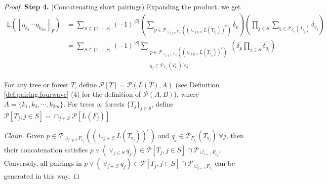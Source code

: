 \begin{proof}
 
 \textbf{Step 4.} (Concatenating short pairings) Expanding the product, we get
 \begin{equation}\label{eq.lemrenorm4.fourwave}
  \begin{split}
  \mathbb{E}([\eta_{k_1}\cdots \eta_{k_{2m}}]_F) &= \sum_{S\subseteq\{1,\cdots,r\}}(-1)^{|S|}
  \left(\sum_{p\in \mathcal{P}_{\cup_{j'\notin S} F_{\mathfrak{r}_{j'}}}((\cup_{j\in S}L(T_{\mathfrak{r}_j}))^c)}\delta_p\right)
  \left(\prod_{j\in S}\sum_{q\in \mathcal{P}_{F_{\mathfrak{r}_j}}(T_{\mathfrak{r}_j})} \delta_{q_j}\right)
  \\
  & =\sum_{S\subseteq\{1,\cdots,r\}}(-1)^{|S|}\sum_{\substack{p\in \mathcal{P}_{\cup_{j'\notin S} F_{\mathfrak{r}_{j'}}}((\cup_{j\in S}L(T_{\mathfrak{r}_j}))^c)
  \\q_j\in 
  \mathcal{P}_{F_{\mathfrak{r}_j}}(T_{\mathfrak{r}_j})\ \forall j}} \left(\delta_p
  \prod_{j\in S} \delta_{q_j}\right)
  \end{split}
 \end{equation}
 
  
  
 For any tree or forest $T$, define $\mathcal{P}[T]=\mathcal{P}(L(T),A)$ (see Definition \ref{def.pairing.fourwave} (4) for the definition of $\mathcal{P}(A,B)$), where $A=\{k_1,k_2,\cdots,k_{2m}\}$. For trees or forests $\{T_j\}_{j\in S}$, define $\mathcal{P}[T_j,j\in S]=\cap_{j\in S}\mathcal{P}[L(F_j)]$. 
 
 \textit{Claim.} Given $p\in \mathcal{P}_{\cup_{j'\notin S} F_{\mathfrak{r}_{j'}}}((\cup_{j\in S}L(T_{\mathfrak{r}_j}))^c)$ and $q_j\in 
 \mathcal{P}_{F_{\mathfrak{r}_j}}(T_{\mathfrak{r}_j})\ \forall j$, then their concatenation satisfies $p\vee (\vee_{j\in S} q_j)\in \mathcal{P}[T_j,j\in S]\cap \mathcal{P}_{\cup_{j=1}^r F_{\mathfrak{r}_{j}}}$. Conversely, all pairings in $p\vee (\vee_{j\in S} q_j)\in \mathcal{P}[T_j,j\in S]\cap \mathcal{P}_{\cup_{j=1}^r F_{\mathfrak{r}_{j}}}$ can be generated in this way.
 

\end{proof}
